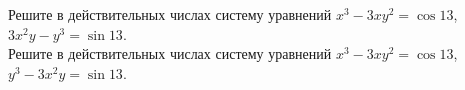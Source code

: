 \begin{problems}

\item
\sbp
Решите в действительных числах систему уравнений
$x^3 - 3 x y^2 = \cos 13$, $3 x^2 y - y^3 = \sin 13$.
\\
\sbp
Решите в действительных числах систему уравнений
$x^3 - 3 x y^2 = \cos 13$, $y^3 - 3 x^2 y = \sin 13$.

\end{problems}

